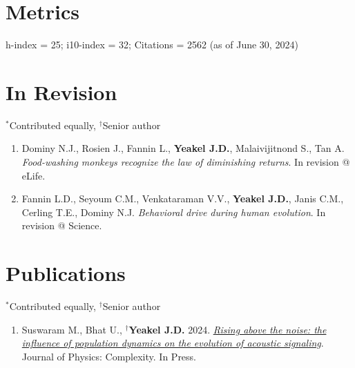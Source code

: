 \documentclass[margin,line,12pt]{res}
\newcommand\reverselabel[1]{%
  \def\theenumi{}%
  \renewcommand\makelabel{\makebox[\dimexpr\labelwidth-3pt\relax][r]{%
    \the\numexpr#1-\value{enumi}+1\relax}}}%
\begin{document}
\begin{resume}
\begin{itemize}
\end{itemize}

\section{\sc Metrics}
h-index = 25; i10-index = 32; Citations = 2562 (as of June 30, 2024)





\section{\sc In Revision}
{\footnotesize{${}^\ast$Contributed equally, ${}^\dag$Senior author}}
\begin{enumerate}
  \reverselabel{43}
\item Dominy N.J., Rosien J., Fannin L., \textbf{Yeakel J.D.}, Malaivijitnond S., Tan A. \emph{Food-washing monkeys recognize the law of diminishing returns}. In revision @ eLife.
\item Fannin L.D., Seyoum C.M., Venkataraman V.V., \textbf{Yeakel J.D.}, Janis C.M., Cerling T.E., Dominy N.J. \emph{Behavioral drive during human evolution}. In revision @ Science.
\end{enumerate}


\section{\sc Publications}
{\footnotesize{${}^\ast$Contributed equally, ${}^\dag$Senior author}}
\begin{enumerate}
  \reverselabel{41}

\item Suswaram M., Bhat U., \textbf{${}^\dag$Yeakel J.D.} 2024. \href{https://iopscience.iop.org/article/10.1088/2632-072X/ad5e2e}{\emph{Rising above the noise: the influence of population dynamics on the evolution of acoustic signaling}}. Journal of Physics: Complexity. In Press.


\end{enumerate}
\end{resume}
\end{document}
